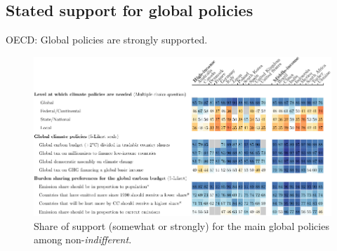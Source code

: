 \begin{framefont}{\small}

\section{Stated support for global policies}

\begin{frame}{OECD: Global policies are strongly supported.\label{global_policies}}
	\vspace{-.3cm}
	\begin{figure}[h!]
		\centering		
		\caption{Share of support (somewhat or strongly) for the main global policies among non-\textit{indifferent}. %
        }
        \vspace{-.2cm}
		\includegraphics[height=.9\textheight]{../figures/OECD/Heatplot_global_tax_attitudes_share.pdf} %
		\end{figure}
\end{frame}



\end{framefont}
